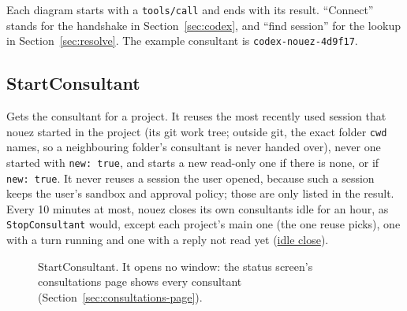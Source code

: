 \documentclass[10pt,a4paper]{article}
\newcommand{\lifelines}[2]{%
  \foreach \x/\name/\col in {#1} {%
    \node[actor, draw=\col, text=\col] at (\x,0) {\name};
    \draw[lifeline] (\x,-0.4) -- (\x,-#2);
  }}
\newcommand{\msg}[4]{\draw[call] (#2,-#1) -- node[above=1pt,lbl]{#4} (#3,-#1);}
\newcommand{\ret}[4]{\draw[reply] (#2,-#1) -- node[above=1pt,lbl]{#4} (#3,-#1);}
\newcommand{\side}[3]{\node[note, anchor=west] at (#2+0.15,-#1) {#3};}
\newcommand{\frm}[5]{%
  \draw[gray, rounded corners=2pt] (#3,-#1) rectangle (#4,-#2);
  \node[anchor=north west, font=\scriptsize\sffamily\bfseries, text=gray, fill=white, inner sep=2pt] at (#3,-#1) {#5};}
\newcommand{\code}[1]{\texttt{#1}}
\begin{document}
Each diagram starts with a \code{tools/call} and ends with its result. ``Connect'' stands for the
handshake in Section~\ref{sec:codex}, and ``find session'' for the lookup in Section~\ref{sec:resolve}.
The example consultant is \code{codex-nouez-4d9f17}.

\subsection{StartConsultant}

Gets the consultant for a project. It reuses the most recently used session that nouez
started in the project (its git work tree; outside git, the exact folder \code{cwd} names, so a
neighbouring folder's consultant is never handed over), never one started with \code{new: true}, and
starts a new read-only one if there is none, or if \code{new: true}. It never reuses a session the
user opened, because such a session keeps the user's sandbox and approval policy; those are only
listed in the result. Every 10 minutes at most, nouez closes its own consultants idle for an hour,
as \code{StopConsultant} would, except each project's main one (the one reuse picks), one with a
turn running and one with a reply not read yet
(\href{https://github.com/jibarix/nouez/blob/v0.31.2/docs/rules.md#rule-idle-close}{idle close}).

\begin{figure}[H]
\centering
{}
\caption{StartConsultant. It opens no window: the status screen's consultations page shows
every consultant (Section~\ref{sec:consultations-page}).}
\end{figure}
\end{document}
